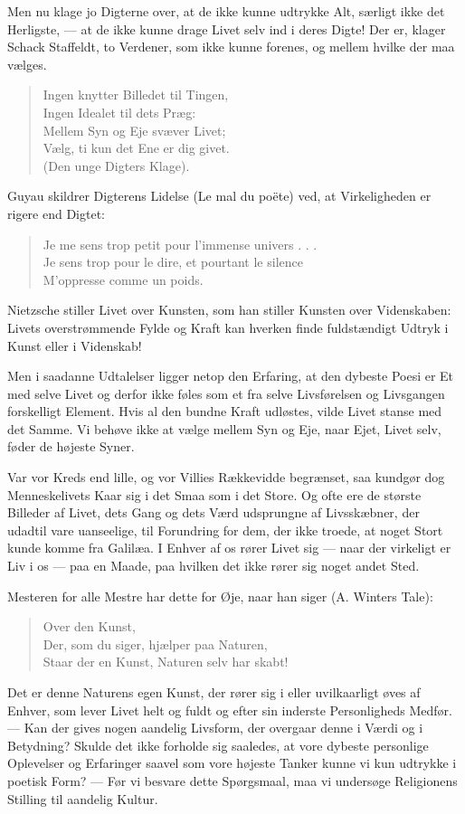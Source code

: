 \documentclass[12pt,a4paper,openany]{book}
\newcommand{\opage}[1]{\marginnote{\footnotesize\textit{[#1]}}}
\begin{document}
Men nu klage jo Digterne over, at de ikke kunne udtrykke
Alt, særligt ikke det Herligste, --- at de ikke kunne drage
Livet selv ind i deres Digte! Der er, klager Schack Staffeldt,
to Verdener, som ikke kunne forenes, og mellem hvilke der
maa vælges.
\begin{quote}
Ingen knytter Billedet til Tingen,\\
Ingen Idealet til dets Præg:\\
Mellem Syn og Eje svæver Livet;\\
Vælg, ti kun det Ene er dig givet.\\
(Den unge Digters Klage).
\end{quote}
\setcounter{footnote}{0}%
\opage{11}Guyau skildrer Digterens Lidelse (Le mal du poëte) ved,
at Virkeligheden er rigere end Digtet:

\begin{quote}
Je me sens trop petit pour l’immense univers . . .\\
Je sens trop pour le dire, et pourtant le silence\\
M’oppresse comme un poids.
\end{quote}

Nietzsche stiller Livet over Kunsten, som han stiller Kunsten
over Videnskaben: Livets overstrømmende Fylde og Kraft kan
hverken finde fuldstændigt Udtryk i Kunst eller i Videnskab!

Men i saadanne Udtalelser ligger netop den Erfaring, at
den dybeste Poesi er Et med selve Livet og derfor ikke føles
som et fra selve Livsførelsen og Livsgangen forskelligt Element.
Hvis al den bundne Kraft udløstes, vilde Livet stanse
med det Samme. Vi behøve ikke at vælge mellem Syn og
Eje, naar Ejet, Livet selv, føder de højeste Syner.

Var vor Kreds end lille, og vor Villies Rækkevidde begrænset,
saa kundgør dog Menneskelivets Kaar sig i det Smaa
som i det Store. Og ofte ere de største Billeder af Livet,
dets Gang og dets Værd udsprungne af Livsskæbner, der udadtil
vare uanseelige, til Forundring for dem, der ikke troede,
at noget Stort kunde komme fra Galilæa. I Enhver af os rører
Livet sig --- naar der virkeligt er Liv i os --- paa en Maade,
paa hvilken det ikke rører sig noget andet Sted.

Mesteren for alle Mestre har dette for Øje, naar han
siger (A. Winters Tale):
\begin{quote}
Over den Kunst,\\
Der, som du siger, hjælper paa Naturen,\\
Staar der en Kunst, Naturen selv har skabt!
\end{quote}
Det er denne Naturens egen Kunst, der rører sig i eller uvilkaarligt
øves af Enhver, som lever Livet helt og fuldt og efter
sin inderste Personligheds Medfør. --- Kan der gives nogen
aandelig Livsform, der overgaar denne i Værdi og i Betydning?
Skulde det ikke forholde sig saaledes, at vore dybeste personlige
Oplevelser og Erfaringer saavel som vore højeste Tanker
kunne vi kun udtrykke i poetisk Form? --- Før vi besvare
\setcounter{footnote}{0}%
\opage{12}dette Spørgsmaal, maa vi undersøge Religionens Stilling til
aandelig Kultur.
\end{document}
